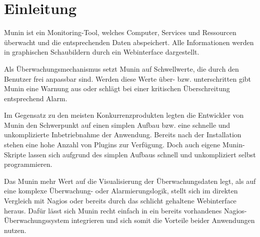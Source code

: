 \section{Einleitung}

Munin ist ein Monitoring-Tool, welches Computer, Services und Ressourcen überwacht und die entsprechenden Daten abspeichert. Alle Informationen werden in graphischen Schaubildern durch ein Webinterface dargestellt.

Als Überwachungsmechanismus setzt Munin auf Schwellwerte, die durch den Benutzer frei anpassbar sind.
Werden diese Werte über- bzw. unterschritten gibt Munin eine Warnung aus oder schlägt bei einer kritischen Überschreitung entsprechend Alarm.

Im Gegensatz zu den meisten Konkurrenzprodukten legten die Entwickler von Munin den Schwerpunkt auf einen simplen Aufbau bzw. eine schnelle und unkomplizierte Inbetriebnahme der Anwendung.
Bereits nach der Installation stehen eine hohe Anzahl von Plugins zur Verfügung.
Doch auch eigene Munin-Skripte lassen sich aufgrund des simplen Aufbaus schnell und unkompliziert selbst programmieren.

Das Munin mehr Wert auf die Visualisierung der Überwachungsdaten legt, als auf eine komplexe Überwachung- oder Alarmierungslogik, stellt sich im direkten Vergleich mit Nagios oder bereits durch das schlicht gehaltene Webinterface heraus.
Dafür lässt sich Munin recht einfach in ein bereits vorhandenes Nagios-Überwachungssystem integrieren und sich somit die Vorteile beider Anwendungen nutzen.